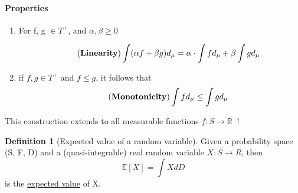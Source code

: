 \documentclass[10pt,a4paper]{article}
\theoremstyle{definition}
\newtheorem{definition}{Definition}[part]
\theoremstyle{plain}
\begin{document}
\paragraph{Properties} 
\begin{enumerate}
	\item For f, g $\in T^+$, and $\alpha, \beta \geq 0$ 
	
	\begin{equation}
		\tag{\textbf{Linearity}}
	 	\int (\alpha f + \beta g)d_\mu = \alpha \cdot \int fd_\mu + \beta \int gd_\mu
	 \end{equation}
	\item  if $f, g \in T^+$ and $ f \leq g$, it follows that 
	\begin{equation}
		\tag{\textbf{Monotonicity}}
		\int fd_\mu \leq \int gd_\mu
	\end{equation}
\end{enumerate}
This construction extends to all measurable functions $f: S\to \mathbb{R}\ $ !

\begin{definition}[Expected value of a random variable]
	Given a probability space (S, F, D) and a (quasi-integrable) real random variable $X: S \to R$, then
	$$ \mathbb{E}[X] = \int XdD$$
	is the \underline{expected value} of X.
\end{definition}
\end{document}

